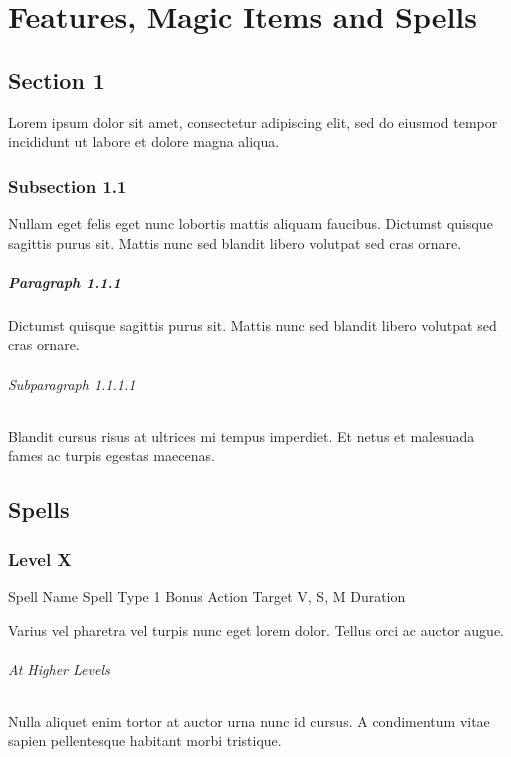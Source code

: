 \documentclass[letterpaper,openany,oneside,twocolumn]{book}
\begin{document}
\onecolumn


\rendercharactersheet

\renderbackgroundsheet

\renderspellsheet


\restoregeometry
\twocolumn

\chapter*{Features, Magic Items and Spells}

\section*{Section 1}
Lorem ipsum dolor sit amet, consectetur adipiscing elit, sed do eiusmod tempor incididunt ut labore et dolore magna aliqua.
\subsection*{Subsection 1.1}
Nullam eget felis eget nunc lobortis mattis aliquam faucibus. Dictumst quisque sagittis purus sit. Mattis nunc sed blandit libero volutpat sed cras ornare.
\paragraph*{Paragraph 1.1.1}
Dictumst quisque sagittis purus sit. Mattis nunc sed blandit libero volutpat sed cras ornare.
\subparagraph*{Subparagraph 1.1.1.1}
Blandit cursus risus at ultrices mi tempus imperdiet. Et netus et malesuada fames ac turpis egestas maecenas.

\section*{Spells}
\subsection*{Level X}

\DndSpellHeader
  {Spell Name}
  {Spell Type}
  {1 Bonus Action}
  {Target}
  {V, S, M}
  {Duration}

Varius vel pharetra vel turpis nunc eget lorem dolor. Tellus orci ac auctor augue.

\subparagraph*{At Higher Levels} Nulla aliquet enim tortor at auctor urna nunc id cursus. A condimentum vitae sapien pellentesque habitant morbi tristique.
\end{document}
